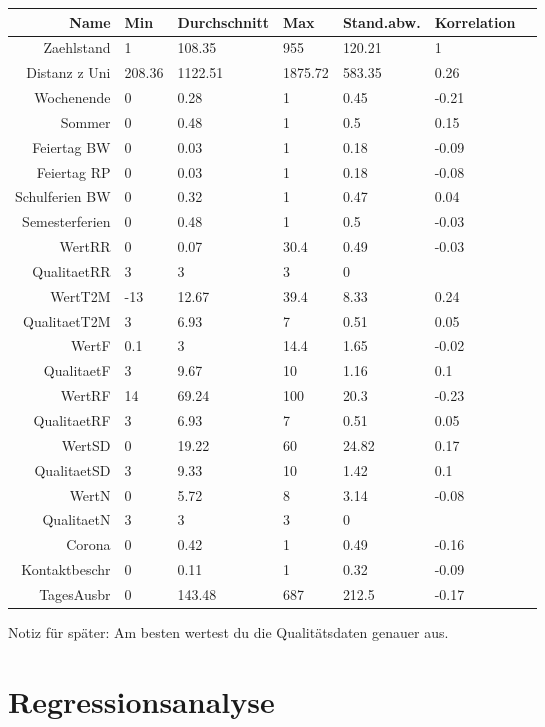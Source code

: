 \documentclass[a4paper,12pt]{thesis}
\begin{document}
\begin{table}[!ht]
	\centering
	\begin{tabular}{rllllll}
		\hline
		Name & Min & Durchschnitt & Max & Stand.abw. & Korrelation \\ 
		\hline
		Zaehlstand & 1 & 108.35 & 955 & 120.21 & 1 \\ 
		Distanz z Uni & 208.36 & 1122.51 & 1875.72 & 583.35 & 0.26 \\ 
		Wochenende & 0 & 0.28 & 1 & 0.45 & -0.21 \\ 
		Sommer & 0 & 0.48 & 1 & 0.5 & 0.15 \\ 
		Feiertag BW & 0 & 0.03 & 1 & 0.18 & -0.09 \\ 
		Feiertag RP & 0 & 0.03 & 1 & 0.18 & -0.08 \\ 
		Schulferien BW & 0 & 0.32 & 1 & 0.47 & 0.04 \\ 
		Semesterferien & 0 & 0.48 & 1 & 0.5 & -0.03 \\ 
		WertRR & 0 & 0.07 & 30.4 & 0.49 & -0.03 \\ 
		QualitaetRR & 3 & 3 & 3 & 0 &  \\ 
		WertT2M & -13 & 12.67 & 39.4 & 8.33 & 0.24 \\ 
		QualitaetT2M & 3 & 6.93 & 7 & 0.51 & 0.05 \\ 
		WertF & 0.1 & 3 & 14.4 & 1.65 & -0.02 \\ 
		QualitaetF & 3 & 9.67 & 10 & 1.16 & 0.1 \\ 
		WertRF & 14 & 69.24 & 100 & 20.3 & -0.23 \\ 
		QualitaetRF & 3 & 6.93 & 7 & 0.51 & 0.05 \\ 
		WertSD & 0 & 19.22 & 60 & 24.82 & 0.17 \\ 
		QualitaetSD & 3 & 9.33 & 10 & 1.42 & 0.1 \\ 
		WertN & 0 & 5.72 & 8 & 3.14 & -0.08 \\ 
		QualitaetN & 3 & 3 & 3 & 0 &  \\ 
		Corona & 0 & 0.42 & 1 & 0.49 & -0.16 \\ 
		Kontaktbeschr & 0 & 0.11 & 1 & 0.32 & -0.09 \\ 
		TagesAusbr & 0 & 143.48 & 687 & 212.5 & -0.17 \\ 
		\hline
	\end{tabular}
	\label{Tabelle1}
\end{table}

Notiz für später: Am besten wertest du die Qualitätsdaten genauer aus.


\section{Regressionsanalyse}
\end{document}
